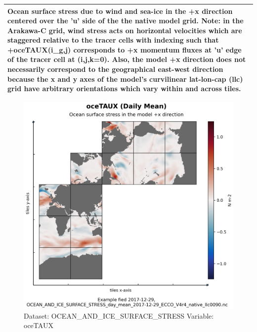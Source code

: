 \begin{longtable}{|p{}|p{}|p{}|p{}|}
\multicolumn{4}{|p{1\textwidth}|}{Ocean surface stress due to wind and sea-ice in the +x direction centered over the 'u' side of the the native model grid. Note: in the Arakawa-C grid, wind stress acts on horizontal velocities which are staggered relative to the tracer cells with indexing such that +oceTAUX(i\_g,j) corresponds to +x momentum fluxes at 'u' edge of the tracer cell at (i,j,k=0). Also, the model +x direction does not necessarily correspond to the geographical east-west direction because the x and y axes of the model's curvilinear lat-lon-cap (llc) grid have arbitrary orientations which vary within and across tiles.} \\ \hline
\end{longtable}

\begin{figure}[H]
\centering
\includegraphics[width=\textwidth]{../images/plots/native_plots/Ocean_and_Sea-Ice_Surface_Stress/oceTAUX.png}
\caption{Dataset: OCEAN\_AND\_ICE\_SURFACE\_STRESS Variable: oceTAUX}
\label{tab:table-OCEAN_AND_ICE_SURFACE_STRESS_oceTAUX-Plot}
\end{figure}
\pagebreak
